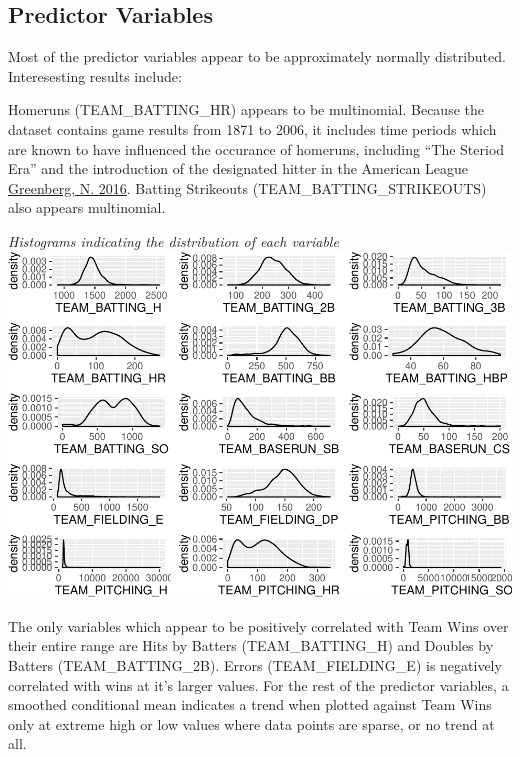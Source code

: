 \documentclass[]{article}
\begin{document}
\subsection{Predictor Variables}\label{predictor-variables}

Most of the predictor variables appear to be approximately normally
distributed. Interesesting results include:

Homeruns (TEAM\_BATTING\_HR) appears to be multinomial. Because the
dataset contains game results from 1871 to 2006, it includes time
periods which are known to have influenced the occurance of homeruns,
including ``The Steriod Era'' and the introduction of the designated
hitter in the American League
\href{https://www.washingtonpost.com/news/fancy-stats/wp/2016/03/07/the-perfect-storm-that-created-baseballs-biggest-home-run-surge-since-the-steroid-era/}{Greenberg,
N. 2016}. Batting Strikeouts (TEAM\_BATTING\_STRIKEOUTS) also appears
multinomial.

\emph{Histograms indicating the distribution of each variable}\\
\includegraphics{DATA621-Homework-1_files/figure-latex/unnamed-chunk-4-1.pdf}

The only variables which appear to be positively correlated with Team
Wins over their entire range are Hits by Batters (TEAM\_BATTING\_H) and
Doubles by Batters (TEAM\_BATTING\_2B). Errors (TEAM\_FIELDING\_E) is
negatively correlated with wins at it's larger values. For the rest of
the predictor variables, a smoothed conditional mean indicates a trend
when plotted against Team Wins only at extreme high or low values where
data points are sparse, or no trend at all.
\end{document}
